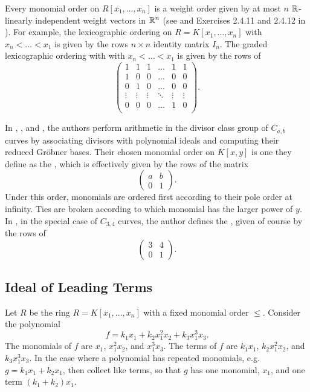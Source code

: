 Every monomial order on $R[x_1, \ldots, x_n]$ is a weight order given by at most $n$ $\mathbb{R}$-linearly independent weight vectors in $\mathbb{R}^n$
(see \cite{robbiano86} and Exercises 2.4.11 and 2.4.12 in \cite{cox07}).
For example, the lexicographic ordering on $R = K[x_1, \ldots, x_n]$ with $x_n < \dots < x_1$ is given by the rows $n \times n$ identity matrix $I_n$.
The graded lexicographic ordering with with $x_n < \dots < x_1$ is given by the rows of
  \[ \begin{pmatrix}
       1 & 1 & 1 & \dots & 1 & 1 \\
       1 & 0 & 0 & \dots & 0 & 0 \\
       0 & 1 & 0 & \dots & 0 & 0 \\
       \vdots & \vdots & \vdots & \ddots & \vdots & \vdots \\
       0 & 0 & 0 & \dots & 1 & 0 \\
     \end{pmatrix}. \]

In \cite{arita99}, \cite{arita03-1}, and \cite{harasawa00}, the authors perform arithmetic in the divisor class group of $C_{a,b}$ curves
by associating divisors with polynomial ideals and computing their reduced Gr\"obner bases.
Their chosen monomial order on $K[x,y]$ is one they define as the ,
which is effectively given by the rows of the matrix
\[ \begin{pmatrix} a & b \\ 0 & 1 \end{pmatrix}. \]
Under this order, monomials are ordered first according to their pole order at infinity.
Ties are broken according to which monomial has the larger power of $y$.
In \cite{arita03-2}, in the special case of $C_{3,4}$ curves, the author defines the ,
given of course by the rows of
\[ \begin{pmatrix} 3 & 4 \\ 0 & 1 \end{pmatrix}. \]




\subsection{Ideal of Leading Terms}

Let $R$ be the ring $R = K[x_1, \ldots, x_n]$ with a fixed monomial order $\leq$.
Consider the polynomial
\[ f = k_1x_1 + k_2x_1^2x_2 + k_3x_1^3x_3. \]
The monomials of $f$ are $x_1$, $x_1^2x_2$, and $x_1^3x_3$.
The terms of $f$ are $k_1x_1$, $k_2x_1^2x_2$, and $k_3x_1^3x_3$.
In the case where a polynomial has repeated monomials, e.g. $g = k_1x_1 + k_2x_1$,
then collect like terms, so that $g$ has one monomial, $x_1$, and one term $(k_1 + k_2)x_1$.

